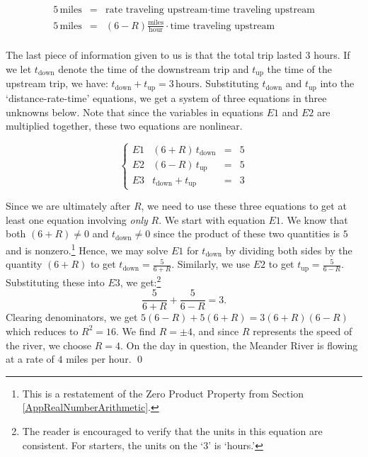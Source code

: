 \begin{ex}
\[\begin{array}{rcl}
5 \, \text{miles} & = & \text{rate traveling upstream} \cdot \text{time traveling upstream} \\ 

5 \, \text{miles} & = & (6 - R) \frac{\text{miles}}{\text{hour}} \cdot \text{time traveling upstream} \\ 	\end{array} \]
 
The last piece of information given to us is that the total trip lasted $3$ hours.  If we let $t_{\text{down}}$ denote the time of the downstream trip and $t_{\text{up}}$ the time of the upstream trip, we have:    $t_{\text{down}} + t_{\text{up}} = 3 \, \text{hours}$.  Substituting $t_{\text{down}}$ and $t_{\text{up}}$ into the `distance-rate-time' equations, we get a system of three equations in three unknowns below.  Note that since the variables in equations $E1$ and $E2$ are multiplied together, these two equations are nonlinear.

 \[\left\{\begin{array}{lrcl}   E1 & (6+R) \, t_{\text{down}} & = & 5 \\ E2 & (6-R) \, t_{\text{up}} & = & 5 \\ E3 & t_{\text{down}} + t_{\text{up}} & = & 3 \end{array} \right.\]

Since we are ultimately after $R$, we need to use these three equations to get at least one equation involving \textit{only} $R$.  We start with equation $E1$. We know that both $(6+R) \neq 0$  and  $t_{\text{down}} \neq 0$ since the product of these two quantities is $5$ and is nonzero.\footnote{This is a restatement of the Zero Product Property from Section \ref{AppRealNumberArithmetic}.}  Hence, we may solve $E1$ for $t_{\text{down}}$ by dividing both sides by the quantity $(6+R)$ to get $t_{\text{down}} = \frac{5}{6+R}$.   Similarly, we use $E2$  to get $t_{\text{up}} = \frac{5}{6-R}$. Substituting these into $E3$, we get:\footnote{The reader is encouraged to verify that the units in this equation are consistent. For starters, the units on the `3' is `hours.'} \[\dfrac{5}{6+R} + \dfrac{5}{6 - R} = 3.\] Clearing denominators, we get $5(6-R) + 5(6+R) = 3(6+R)(6-R)$ which reduces to  $R^2 = 16$.   We find $R = \pm 4$, and since $R$ represents the speed of the river, we choose $R = 4$.   On the day in question, the Meander River is flowing at a rate of $4$ miles per hour. \qed

\end{ex}

